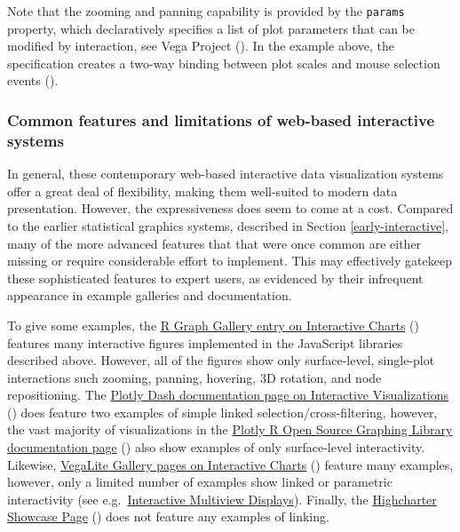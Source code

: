 \documentclass[
  openany]{book}
\theoremstyle{definition}
\theoremstyle{definition}
\theoremstyle{definition}
\theoremstyle{definition}
\theoremstyle{remark}
\begin{document}
Note that the zooming and panning capability is provided by the \texttt{params} property, which declaratively specifies a list of plot parameters that can be modified by interaction, see Vega Project (). In the example above, the specification creates a two-way binding between plot scales and mouse selection events ().

\subsubsection{Common features and limitations of web-based interactive systems}\label{common-features-and-limitations-of-web-based-interactive-systems}

In general, these contemporary web-based interactive data visualization systems offer a great deal of flexibility, making them well-suited to modern data presentation. However, the expressiveness does seem to come at a cost. Compared to the earlier statistical graphics systems, described in Section \ref{early-interactive}, many of the more advanced features that that were once common are either missing or require considerable effort to implement. This may effectively gatekeep these sophisticated features to expert users, as evidenced by their infrequent appearance in example galleries and documentation.

To give some examples, the \href{https://r-graph-gallery.com/interactive-charts.html}{R Graph Gallery entry on Interactive Charts} () features many interactive figures implemented in the JavaScript libraries described above. However, all of the figures show only surface-level, single-plot interactions such zooming, panning, hovering, 3D rotation, and node repositioning. The \href{https://dash.plotly.com/interactive-graphing}{Plotly Dash documentation page on Interactive Visualizations} () does feature two examples of simple linked selection/cross-filtering, however, the vast majority of visualizations in the \href{https://plotly.com/r/}{Plotly R Open Source Graphing Library documentation page} () also show examples of only surface-level interactivity. Likewise, \href{https://vega.github.io/vega-lite/examples/\#interactive-charts}{VegaLite Gallery pages on Interactive Charts} () feature many examples, however, only a limited number of examples show linked or parametric interactivity (see e.g.~\href{https://vega.github.io/vega-lite/examples/\#interactive-multi-view-displays}{Interactive Multiview Displays}). Finally, the \href{https://jkunst.com/highcharter/articles/showcase.html}{Highcharter Showcase Page} () does not feature any examples of linking.
\end{document}
